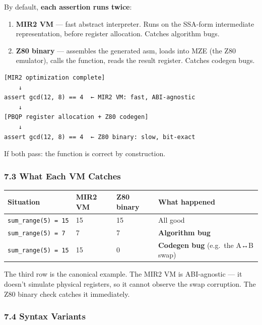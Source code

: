 \documentclass[
  11pt,
]{article}
\begin{document}
By default, \textbf{each assertion runs twice}:

\begin{enumerate}
\def\labelenumi{\arabic{enumi}.}
\item
  \textbf{MIR2 VM} --- fast abstract interpreter. Runs on the SSA-form
  intermediate representation, before register allocation. Catches
  algorithm bugs.
\item
  \textbf{Z80 binary} --- assembles the generated asm, loads into MZE
  (the Z80 emulator), calls the function, reads the result register.
  Catches codegen bugs.
\end{enumerate}

\begin{verbatim}
[MIR2 optimization complete]
    ↓
assert gcd(12, 8) == 4  ← MIR2 VM: fast, ABI-agnostic
    ↓
[PBQP register allocation + Z80 codegen]
    ↓
assert gcd(12, 8) == 4  ← Z80 binary: slow, bit-exact
\end{verbatim}

If both pass: the function is correct by construction.

\hypertarget{what-each-vm-catches}{%
\subsubsection{7.3 What Each VM Catches}\label{what-each-vm-catches}}

\begin{longtable}[]{@{}llll@{}}
\toprule\noalign{}
Situation & MIR2 VM & Z80 binary & What happened \\
\midrule\noalign{}
\endhead
\bottomrule\noalign{}
\endlastfoot
\texttt{sum\_range(5)\ =\ 15} & 15 & 15 & All good \\
\texttt{sum\_range(5)\ =\ 7} & 7 & 7 & \textbf{Algorithm bug} \\
\texttt{sum\_range(5)\ =\ 15} & 15 & 0 & \textbf{Codegen bug} (e.g.~the
A↔B swap) \\
\end{longtable}

The third row is the canonical example. The MIR2 VM is ABI-agnostic ---
it doesn't simulate physical registers, so it cannot observe the swap
corruption. The Z80 binary check catches it immediately.

\hypertarget{syntax-variants}{%
\subsubsection{7.4 Syntax Variants}\label{syntax-variants}}
\end{document}

